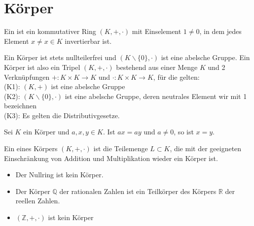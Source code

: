\section{Körper}

\begin{definition}[Körper]
	Ein  ist ein kommutativer Ring $(K,+,\cdot)$ mit Einselement 
	$1 \neq 0$, in dem jedes Element $x \neq x \in K$ invertierbar ist.
\end{definition}

\begin{remark}
	Ein Körper ist stets nullteilerfrei und $(K\backslash\{0\}, \cdot)$ ist eine abelsche
	Gruppe. Ein Körper ist also ein Tripel $(K,+,\cdot)$ bestehend aus einer Menge $K$ und 2 Verknüpfungen
	$+: K \times K \to K$ und $\cdot: K \times K \to K$, für die gelten: \\
	(K1): $(K,+)$ ist eine abelsche Gruppe \\
	(K2): $(K\backslash\{0\}, \cdot)$ ist eine abelsche Gruppe, deren neutrales Element wir mit 1 bezeichnen \\
	(K3): Es gelten die Distributivgesetze.
\end{remark}

\begin{remark}
	Sei $K$ ein Körper und $a,x,y \in K$. Ist $ax=ay$ und $a \neq 0$, so ist $x=y$.
\end{remark}

\begin{definition}[Teilkörper]
	Ein  eines Körpers $(K,+,\cdot)$ ist die Teilemenge $L 
	\subset K$, die mit der geeigneten Einschränkung von Addition und Multiplikation wieder ein
	Körper ist.
\end{definition}

\begin{example}
	\begin{itemize}
		\item Der Nullring ist kein Körper.
		\item Der Körper $\mathbb Q$ der rationalen Zahlen ist ein Teilkörper des Körpers $\mathbb R$ der
		reellen Zahlen.
		\item $(\mathbb Z, + ,\cdot)$ ist kein Körper
	\end{itemize}
\end{example}

